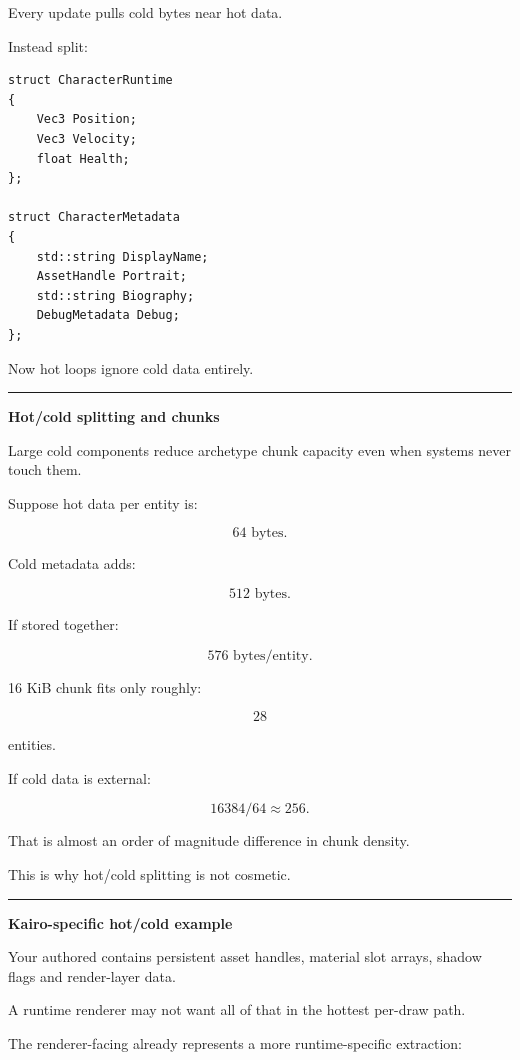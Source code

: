 Every update pulls cold bytes near hot data.

Instead split:

\begin{verbatim}
struct CharacterRuntime
{
    Vec3 Position;
    Vec3 Velocity;
    float Health;
};

struct CharacterMetadata
{
    std::string DisplayName;
    AssetHandle Portrait;
    std::string Biography;
    DebugMetadata Debug;
};
\end{verbatim}

Now hot loops ignore cold data entirely.

\begin{center}\rule{0.5\linewidth}{0.5pt}\end{center}

\textbf{Hot/cold splitting and chunks}

Large cold components reduce archetype chunk capacity even when systems never touch them.

Suppose hot data per entity is:

\[
64\text{ bytes}.
\]

Cold metadata adds:

\[
512\text{ bytes}.
\]

If stored together:

\[
576\text{ bytes/entity}.
\]

16 KiB chunk fits only roughly:

\[
28
\]

entities.

If cold data is external:

\[
16384/64
\approx256.
\]

That is almost an order of magnitude difference in chunk density.

This is why hot/cold splitting is not cosmetic.

\begin{center}\rule{0.5\linewidth}{0.5pt}\end{center}

\textbf{Kairo-specific hot/cold example}

Your authored  contains persistent asset handles, material slot arrays, shadow flags and render-layer data.

A runtime renderer may not want all of that in the hottest per-draw path.

The renderer-facing  already represents a more runtime-specific extraction:

